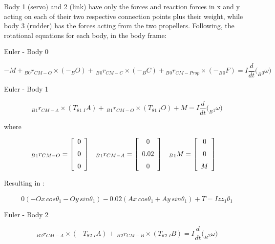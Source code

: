 Body 1 (servo) and 2 (link) have only the forces and reaction forces in x and y acting on each of their two respective connection points plus their weight, while body 3 (rudder) has the forces acting from the two propellers. 
Following, the rotational equations for each body, in the body frame:

Euler - Body 0

 \begin{equation}\label{euler0}
 -M +{_B}{_0}{r}_{CM-O}\times (-{_B}{O}) + \,_B{_0}{r}_{CM-C} \times (-{_B}{C}) + {_B}{_0}{r}_{CM-Prop}\times (-_B{_0}{F}) = I  \frac{d}{dt}(_B{_0}{{\omega})}
\end{equation}


Euler - Body 1 

\begin{equation}\label{euler1}
	_B{_1}{r}_{CM-A}\times (T_\theta{_1} \, {_I}{A}) + \,_B{_1}{r}_{CM-O} \times (T_\theta{_1} \, {_I}{O}) + {M} = I  \frac{d}{dt}(_B{_1}{\omega)}
\end{equation}


where

\begin{align*}
_B{_1}{r}_{CM-O} &= \left[ \begin {array}{c} 0\\ \noalign{\medskip}0\\ \noalign{\medskip}0
\end {array} \right] &
_B{_1}{r}_{CM-A} &= \left[ \begin {array}{c} 0\\ \noalign{\medskip}0.02\\ \noalign{\medskip}0
\end {array} \right]&
_B{_1}{M} &= \left[ \begin {array}{c} 0\\ \noalign{\medskip}0\\ \noalign{\medskip}M
\end {array} \right]&
\end{align*}

Resulting in :

\begin{equation}\label{euler1end}
	0(-Ox\,cos\theta_{{1}} - Oy\,sin\theta_{{1}}) - 0.02(Ax\,cos\theta_{{1}} + Ay\,sin\theta_{{1}}) + T = Izz_{{1}}\ddot\theta_{{1}}
\end{equation}

Euler - Body 2 

\begin{equation}\label{euler2}
	_B{_2}{r}_{CM-A}\times (-T_\theta{_2} \, {_I}{A}) + \,_B{_2}{r}_{CM-B} \times (T_\theta{_2} \, {_I}{B}) = I  \frac{d}{dt}(_B{_2}{\omega)}
\end{equation}


